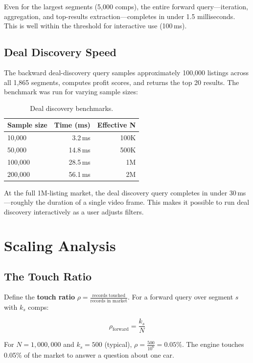 \documentclass[11pt,a4paper,twoside]{book}
\begin{document}
Even for the largest segments (5,000 comps), the entire forward query---iteration,
aggregation, and top-results extraction---completes in under 1.5 milliseconds. This is
well within the threshold for interactive use (100\,ms).

\subsection{Deal Discovery Speed}

The backward deal-discovery query samples approximately 100,000 listings across all 1,865
segments, computes profit scores, and returns the top 20 results. The benchmark was run for
varying sample sizes:

\begin{table}[H]
\centering
\caption{Deal discovery benchmarks.}
\label{tab:deals}
\begin{tabular}{@{}lrr@{}}
\toprule
\textbf{Sample size} & \textbf{Time (ms)} & \textbf{Effective N} \\
\midrule
10,000  & 3.2\,ms & 100K \\
50,000  & 14.8\,ms & 500K \\
100,000 & 28.5\,ms & 1M \\
200,000 & 56.1\,ms & 2M \\
\bottomrule
\end{tabular}
\end{table}

At the full 1M-listing market, the deal discovery query completes in under 30\,ms---roughly
the duration of a single video frame. This makes it possible to run deal discovery
interactively as a user adjusts filters.

\section{Scaling Analysis}

\subsection{The Touch Ratio}

Define the \textbf{touch ratio} $\rho = \frac{\text{records touched}}{\text{records in market}}$.
For a forward query over segment $s$ with $k_s$ comps:

$$\rho_{\text{forward}} = \frac{k_s}{N}$$

For $N = 1,\!000,\!000$ and $k_s = 500$ (typical), $\rho = \frac{500}{10^6} = 0.05\%$.
The engine touches 0.05\% of the market to answer a question about one car.
\end{document}
